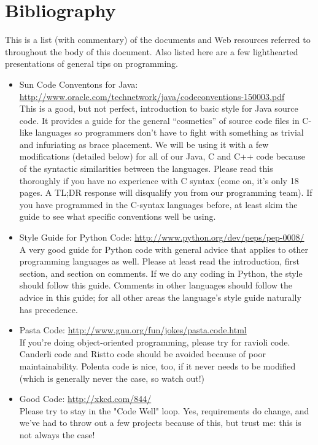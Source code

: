 \documentclass[12pt]{article}
\begin{document}
\section{Bibliography}
\label{sec:references}
This is a list (with commentary) of the documents and Web resources referred to throughout the body of this document. Also listed here are a few lighthearted presentations of general tips on programming.
\begin{itemize}
    \item Sun Code Conventons for Java: \url{http://www.oracle.com/technetwork/java/codeconventions-150003.pdf} \\
        This is a good, but not perfect, introduction to basic style for Java source code. It provides a guide for the general ``cosmetics'' of source code files in C-like languages so programmers don't have to fight with something as trivial and infuriating as brace placement. We will be using it with a few modifications (detailed below) for all of our Java, C and C++ code because of the syntactic similarities between the languages. Please read this thoroughly if you have no experience with C syntax (come on, it's only 18 pages. A TL;DR response will disqualify you from our programming team). If you have programmed in the C-syntax languages before, at least skim the guide to see what specific conventions well be using.
    \item \label{pyguide} Style Guide for Python Code: \url{http://www.python.org/dev/peps/pep-0008/} \\
        A very good guide for Python code with general advice that applies to other programming languages as well. Please at least read the introduction, first section, and section on comments. If we do any coding in Python, the style should follow this guide. Comments in other languages should follow the advice in this guide; for all other areas the language's style guide naturally has precedence.
    \item Pasta Code: \url{http://www.gnu.org/fun/jokes/pasta.code.html} \\
        If you're doing object-oriented programming, please try for ravioli code. Canderli code and Ristto code should be avoided because of poor maintainability. Polenta code is nice, too, if it never needs to be modified (which is generally never the case, so watch out!)
    \item Good Code: \url{http://xkcd.com/844/} \\
        Please try to stay in the "Code Well" loop. Yes, requirements do change, and we've had to throw out a few projects because of this, but trust me: this is not always the case!
\end{itemize}
\end{document}
